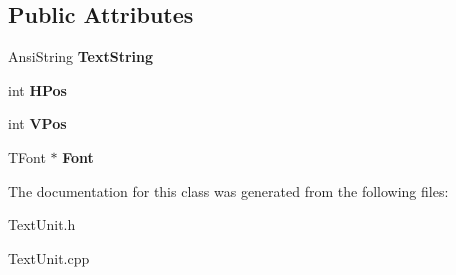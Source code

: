 \subsection*{Public Attributes}
\begin{DoxyCompactItemize}
\item 
\mbox{\label{class_t_text_item_a4c25a60852b8493f06d26e64241aa98f}} 
Ansi\+String {\bfseries Text\+String}
\item 
\mbox{\label{class_t_text_item_a1be1010d3eed8002ab893103a43ffc7b}} 
int {\bfseries H\+Pos}
\item 
\mbox{\label{class_t_text_item_a7fc4c3a7d8583931e2ac595006550f9c}} 
int {\bfseries V\+Pos}
\item 
\mbox{\label{class_t_text_item_a0960b6aa95ed04a4e7bc9131dd6e879e}} 
T\+Font $\ast$ {\bfseries Font}
\end{DoxyCompactItemize}


The documentation for this class was generated from the following files\+:\begin{DoxyCompactItemize}
\item 
Text\+Unit.\+h\item 
Text\+Unit.\+cpp\end{DoxyCompactItemize}
